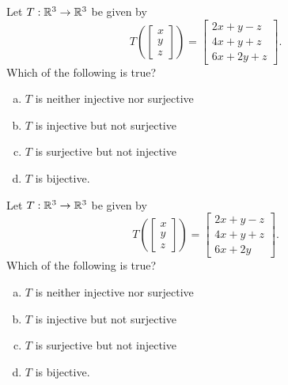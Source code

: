 \begin{applicationActivities}{3}{19}
\begin{activity}{5}
Let $T: \mathbb{R}^3 \rightarrow \mathbb{R}^3$ be given by $$T\left(\begin{bmatrix} x \\ y  \\ z \end{bmatrix} \right) = \begin{bmatrix} 2x+y-z \\ 4x+y+z \\ 6x+2y+z\end{bmatrix}.$$  Which of the following is true?
\begin{enumerate}[(a)]
\item $T$ is neither injective nor surjective
\item $T$ is injective but not surjective
\item $T$ is surjective but not injective
\item $T$ is bijective.
\end{enumerate}
\end{activity}

\begin{activity}{5}
Let $T: \mathbb{R}^3 \rightarrow \mathbb{R}^3$ be given by $$T\left(\begin{bmatrix} x \\ y  \\ z \end{bmatrix} \right) = \begin{bmatrix} 2x+y-z \\ 4x+y+z \\ 6x+2y\end{bmatrix}.$$  Which of the following is true?
\begin{enumerate}[(a)]
\item $T$ is neither injective nor surjective
\item $T$ is injective but not surjective
\item $T$ is surjective but not injective
\item $T$ is bijective.
\end{enumerate}
\end{activity}


\end{applicationActivities}
